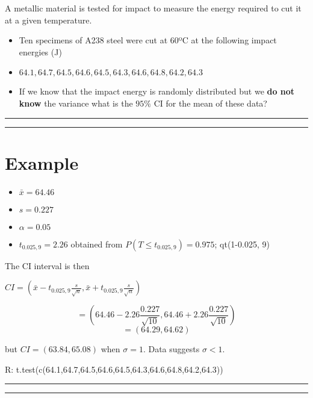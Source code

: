 \documentclass[
]{book}
\providecommand{\tightlist}{%
  \setlength{\itemsep}{0pt}\setlength{\parskip}{0pt}}
\begin{document}
A metallic material is tested for impact to measure the energy required to cut it at a given temperature.

\begin{itemize}
\item
  Ten specimens of A238 steel were cut at 60ºC at the following impact energies (J)
\item
  \(64.1, 64.7, 64.5, 64.6, 64.5, 64.3, 64.6, 64.8, 64.2, 64.3\)
\item
  If we know that the impact energy is randomly distributed but we \textbf{do not know} the variance what is the \(95\%\) CI for the mean of these data?
\end{itemize}

\begin{center}\rule{0.5\linewidth}{0.5pt}\end{center}

\begin{center}\rule{0.5\linewidth}{0.5pt}\end{center}

\hypertarget{example-19}{%
\section{Example}\label{example-19}}

\begin{itemize}
\tightlist
\item
  \(\bar{x}=64.46\)
\item
  \(s=0.227\)
\item
  \(\alpha=0.05\)
\item
  \(t_{0.025,9}=2.26\) obtained from \(P(T \leq t_{0.025,9})=0.975\); qt(1-0.025, 9)
\end{itemize}

The CI interval is then

\(CI=(\bar{x}- t_{0.025,9}\frac{s}{\sqrt{n}},\bar{x}+t_{0.025,9} \frac{s}{\sqrt{n}})\)

\[=(64.46-2.26 \frac{0.227}{\sqrt{10}},64.46+2.26 \frac{0.227}{\sqrt{10}})\] \[=(64.29,64.62)\]

but \(CI=(63.84,65.08)\) when \(\sigma=1\). Data suggests \(\sigma<1\).

R: t.test(c(64.1,64.7,64.5,64.6,64.5,64.3,64.6,64.8,64.2,64.3))

\begin{center}\rule{0.5\linewidth}{0.5pt}\end{center}

\begin{center}\rule{0.5\linewidth}{0.5pt}\end{center}
\end{document}
